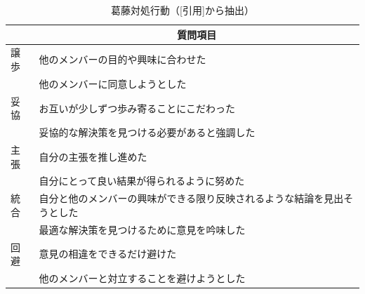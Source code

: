 \documentclass[11pt, a4paper]{jreport} %
\begin{document}
\begin{table}[H]
\caption{葛藤対処行動（{[}引用{]}から抽出）}
\centering
\label{tab:conflict_deal}
\begin{tabular}{@{}ll@{}}
\toprule
\multicolumn{1}{c}{} & \multicolumn{1}{c}{質問項目}             \\ \midrule
譲歩                   & 他のメンバーの目的や興味に合わせた                    \\
                     & 他のメンバーに同意しようとした                      \\
妥協                   & お互いが少しずつ歩み寄ることにこだわった                 \\
                     & 妥協的な解決策を見つける必要があると強調した               \\
主張                   & 自分の主張を推し進めた                          \\
                     & 自分にとって良い結果が得られるように努めた                \\
統合                   & 自分と他のメンバーの興味ができる限り反映されるような結論を見出そうとした \\
                     & 最適な解決策を見つけるために意見を吟味した                \\
回避                   & 意見の相違をできるだけ避けた                       \\
                     & 他のメンバーと対立することを避けようとした                \\ \bottomrule
\end{tabular}
\end{table}
\end{document}
